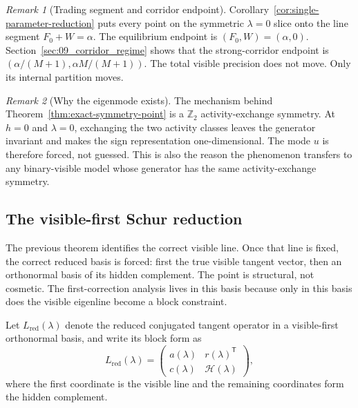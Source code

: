 \documentclass[11pt]{article}
\numberwithin{equation}{section}
\theoremstyle{thmcompact}
\theoremstyle{remark}
\newtheorem*{remarkplain}{Remark}
\begin{document}
\begin{remarkplain}[Trading segment and corridor endpoint]
Corollary~\ref{cor:single-parameter-reduction} puts every point on the symmetric $\lambda=0$ slice onto the line segment $F_0+W=\alpha$. The equilibrium endpoint is $(F_0,W)=(\alpha,0)$. Section~\ref{sec:09_corridor_regime} shows that the strong-corridor endpoint is $(\alpha/(M+1),\alpha M/(M+1))$. The total visible precision does not move. Only its internal partition moves.
\end{remarkplain}

\begin{remarkplain}[Why the eigenmode exists]
The mechanism behind Theorem~\ref{thm:exact-symmetry-point} is a $\mathbb Z_2$ activity-exchange symmetry. At $h=0$ and $\lambda=0$, exchanging the two activity classes leaves the generator invariant and makes the sign representation one-dimensional. The mode $u$ is therefore forced, not guessed. This is also the reason the phenomenon transfers to any binary-visible model whose generator has the same activity-exchange symmetry.
\end{remarkplain}

\subsection{The visible-first Schur reduction}

The previous theorem identifies the correct visible line. Once that line is fixed, the correct reduced basis is forced: first the true visible tangent vector, then an orthonormal basis of its hidden complement. The point is structural, not cosmetic. The first-correction analysis lives in this basis because only in this basis does the visible eigenline become a block constraint.

Let $L_{\mathrm{red}}(\lambda)$ denote the reduced conjugated tangent operator in a visible-first orthonormal basis, and write its block form as
\begin{equation}\label{eq:Lred-block-general}
L_{\mathrm{red}}(\lambda)=
\begin{pmatrix}
a(\lambda) & r(\lambda)^{\mathsf T}\\
c(\lambda) & \mathcal H(\lambda)
\end{pmatrix},
\end{equation}
where the first coordinate is the visible line and the remaining coordinates form the hidden complement.
\end{document}
